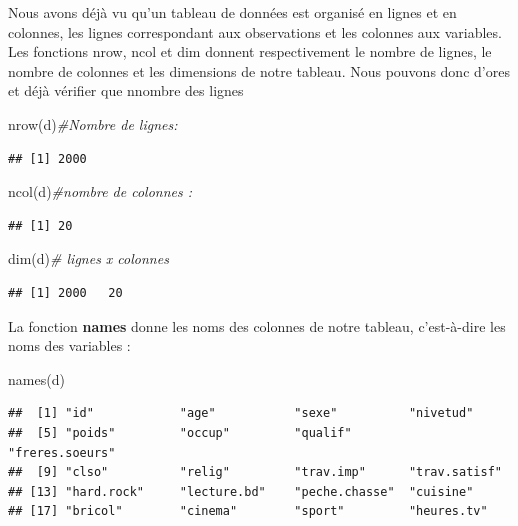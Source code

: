 \documentclass[
]{book}
\newenvironment{Shaded}{\begin{snugshade}}{\end{snugshade}}
\newcommand{\CommentTok}[1]{\textcolor[rgb]{0.56,0.35,0.01}{\textit{#1}}}
\newcommand{\FunctionTok}[1]{\textcolor[rgb]{0.00,0.00,0.00}{#1}}
\newcommand{\NormalTok}[1]{#1}
\begin{document}
Nous avons déjà vu qu'un tableau de données est organisé en lignes et en colonnes, les lignes correspondant aux observations et les colonnes aux variables. Les fonctions nrow, ncol et dim donnent respectivement le nombre de lignes, le nombre de colonnes et les dimensions de notre tableau. Nous pouvons donc d'ores et déjà vérifier que nnombre des lignes

\begin{Shaded}
\begin{Highlighting}[]
\FunctionTok{nrow}\NormalTok{(d)}\CommentTok{\#Nombre de lignes:}
\end{Highlighting}
\end{Shaded}

\begin{verbatim}
## [1] 2000
\end{verbatim}

\begin{Shaded}
\begin{Highlighting}[]
\FunctionTok{ncol}\NormalTok{(d)}\CommentTok{\#nombre de colonnes :}
\end{Highlighting}
\end{Shaded}

\begin{verbatim}
## [1] 20
\end{verbatim}

\begin{Shaded}
\begin{Highlighting}[]
\FunctionTok{dim}\NormalTok{(d)}\CommentTok{\# lignes x colonnes}
\end{Highlighting}
\end{Shaded}

\begin{verbatim}
## [1] 2000   20
\end{verbatim}

La fonction \textbf{names} donne les noms des colonnes de notre tableau, c'est-à-dire les noms des variables :

\begin{Shaded}
\begin{Highlighting}[]
\FunctionTok{names}\NormalTok{(d)}
\end{Highlighting}
\end{Shaded}

\begin{verbatim}
##  [1] "id"            "age"           "sexe"          "nivetud"      
##  [5] "poids"         "occup"         "qualif"        "freres.soeurs"
##  [9] "clso"          "relig"         "trav.imp"      "trav.satisf"  
## [13] "hard.rock"     "lecture.bd"    "peche.chasse"  "cuisine"      
## [17] "bricol"        "cinema"        "sport"         "heures.tv"
\end{verbatim}
\end{document}
